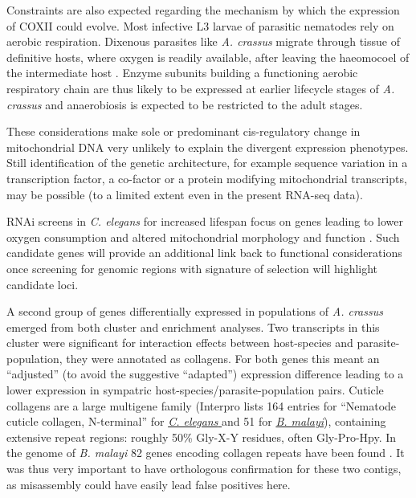 Constraints are also expected regarding the mechanism by which the
expression of COXII could evolve. Most infective L3 larvae of parasitic
nematodes rely on aerobic respiration. Dixenous parasites like
\textit{A. crassus} migrate through tissue of definitive hosts, where
oxygen is readily available, after leaving the haeomocoel of the
intermediate host \cite{kennedy2001parasitic}. Enzyme subunits
building a functioning aerobic respiratory chain are thus likely to be
expressed at earlier lifecycle stages of \textit{A. crassus} and
anaerobiosis is expected to be restricted to the adult stages.

These considerations make sole or predominant cis-regulatory change in
mitochondrial DNA very unlikely to explain the divergent expression
phenotypes. Still identification of the genetic architecture, for
example sequence variation in a transcription factor, a co-factor or a
protein modifying mitochondrial transcripts, may be possible (to a
limited extent even in the present RNA-seq data).

RNAi screens in \textit{C. elegans} for increased lifespan focus on
genes leading to lower oxygen consumption and altered mitochondrial
morphology and function \cite{pmid12447374}. Such candidate genes will
provide an additional link back to functional considerations once
screening for genomic regions with signature of selection will
highlight candidate loci.




A second group of genes differentially expressed in populations of
\textit{A. crassus} emerged from both cluster and enrichment
analyses. Two transcripts in this cluster were significant for
interaction effects between host-species and parasite-population, they
were annotated as collagens. For both genes this meant an ``adjusted''
(to avoid the suggestive ``adapted'') expression difference leading to
a lower expression in sympatric host-species/parasite-population
pairs. Cuticle collagens are a large multigene family (Interpro lists
164 entries for ``Nematode cuticle collagen, N-terminal'' for
\href{http://www.ebi.ac.uk/interpro/ISpy?ipr=IPR002486&tax=6239}{\textit{C. elegans}
} and 51 for
\href{http://www.ebi.ac.uk/interpro/ISpy?ipr=IPR002486&tax=6279}{\textit{B. malayi}}),
containing extensive repeat regions: roughly 50\% Gly-X-Y residues,
often Gly-Pro-Hpy. In the genome of \textit{B. malayi} 82 genes
encoding collagen repeats have been found \cite{ghedin_draft_2007}. It
was thus very important to have orthologous confirmation for these two
contigs, as misassembly could have easily lead false positives here.

